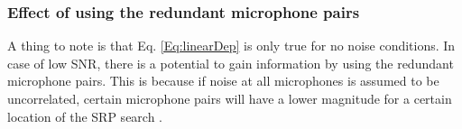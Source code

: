 \subsubsection{Effect of using the redundant microphone pairs}
A thing to note is that Eq. \ref{Eq:linearDep} is only true for no noise conditions. In case of low SNR, there is a potential to gain information by using the redundant microphone pairs. This is because if noise at all microphones is assumed to be uncorrelated, certain microphone pairs will have a lower magnitude for a certain location of the SRP search .